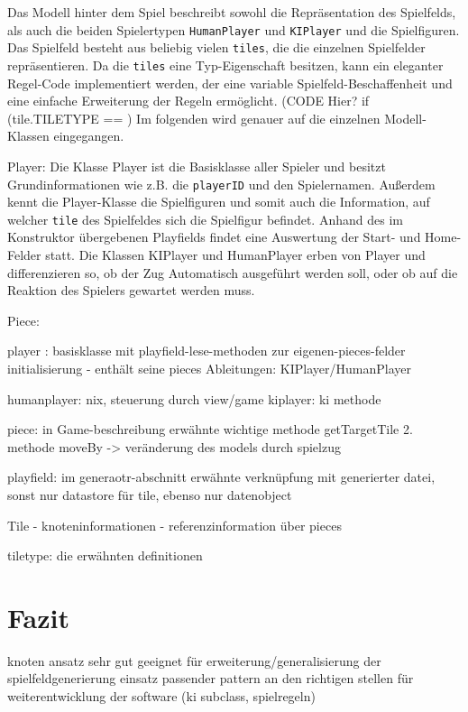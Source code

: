 \documentclass[conference]{IEEEtran}
\begin{document}
Das Modell hinter dem Spiel beschreibt sowohl die Repr\"asentation des Spielfelds, als auch die beiden Spielertypen \texttt{HumanPlayer} und \texttt{KIPlayer} und die Spielfiguren. Das Spielfeld besteht aus beliebig vielen \texttt{tiles}, die die einzelnen Spielfelder repr\"asentieren. Da die \texttt{tiles} eine Typ-Eigenschaft besitzen, kann ein eleganter Regel-Code implementiert werden, der eine variable Spielfeld-Beschaffenheit und eine einfache Erweiterung der Regeln erm\"oglicht. (CODE Hier?  if (tile.TILETYPE == ) 
Im folgenden wird genauer auf die einzelnen Modell-Klassen eingegangen.

Player: Die Klasse Player ist die Basisklasse aller Spieler und besitzt Grundinformationen wie z.B. die \texttt{playerID} und den Spielernamen. Außerdem kennt die Player-Klasse die Spielfiguren und somit auch die Information, auf welcher \texttt{tile} des Spielfeldes sich die Spielfigur befindet. Anhand des im Konstruktor übergebenen Playfields findet eine Auswertung der Start- und Home-Felder statt. Die Klassen KIPlayer und HumanPlayer erben von Player und differenzieren so, ob der Zug Automatisch ausgeführt werden soll, oder ob auf die Reaktion des Spielers gewartet werden muss. 

Piece:  

player : basisklasse mit playfield-lese-methoden zur eigenen-pieces-felder initialisierung
      - enth\"alt seine pieces
      Ableitungen: KIPlayer/HumanPlayer

humanplayer: nix, steuerung durch view/game
kiplayer: ki methode

piece: in Game-beschreibung erwähnte wichtige methode getTargetTile
2. methode moveBy -> veränderung des models durch spielzug

playfield: im generaotr-abschnitt erwähnte verknüpfung mit generierter datei, sonst nur datastore für tile, ebenso nur datenobject

Tile 
  - knoteninformationen
  - referenzinformation \"uber pieces


tiletype: die erwähnten definitionen

\section{Fazit}

knoten ansatz sehr gut geeignet f\"ur erweiterung/generalisierung der spielfeldgenerierung
einsatz passender pattern an den richtigen stellen f\"ur weiterentwicklung der software
(ki subclass, spielregeln)
\end{document}
